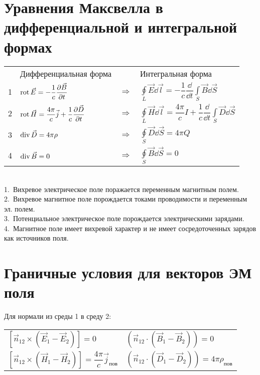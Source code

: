 \begin{multicols*}{2}
		\section{Уравнения Максвелла в дифференциальной и интегральной формах}
        \begin{tabular}{c|lcl|}
            {} & {Дифференциальная форма} & {} & {Интегральная форма} \\
            {1} & {$\operatorname{rot}\vec{E}=-\dfrac1c\dfrac{\partial{\vec{B}}}{\partial{t}}$} & {$\Rightarrow$} & { $\oint\limits_L\vec{E}\dd\vec{l}=-\dfrac1c\dfrac\dd{\dd{t}}\int\limits_S\vec{B}\dd{\vec{S}}$} \\

            {2} & {$\operatorname{rot}\vec{H} = \dfrac{4\pi}{c}\vec{j} + \dfrac1c\dfrac{\partial{\vec{D}}}{\partial{t}}$} & {$\Rightarrow$} & {$\oint\limits_L\vec{H}\dd\vec{l} = \dfrac{4\pi}{c}I+\dfrac1c\dfrac\dd{\dd{t}}\int\limits_S\vec{D}\dd{\vec{S}}$} \\

            {3} & {$\operatorname{div}\vec{D}=4\pi \rho$} & {$\Rightarrow$} & {$\oint\limits_S\vec{D}\dd{\vec{S}}=4\pi Q$} \\

            {4} & {$\operatorname{div}\vec{B}=0$} & {$\Rightarrow$} & {$\oint\limits_S\vec{B}\dd{\vec{S}}=0$}
         \end{tabular} \\
         1.~Вихревое электрическое поле поражается переменным магнитным полем. \\
         2.~Вихревое магнитное поле порождается токами проводимости и переменным эл. полем. \\
         3.~Потенциальное электрическое поле порождается электрическими зарядами. \\
         4.~Магнитное поле имеет вихревой характер и не имеет сосредоточенных зарядов как источников поля.

		\section{Граничные условия для векторов ЭМ поля}
        Для нормали из среды 1 в среду 2: \\
        \begin{tabular}{l|l}
            $\left[\vec{n}_{12}\times(\vec E_1-\vec E_2)\right]=0$ &
            $\left(\vec{n}_{12}\cdot(\vec B_1-\vec B_2)\right)=0$ \\
            $\left[\vec{n}_{12}\times(\vec H_1-\vec H_2)\right]=\dfrac{4\pi}{c}\vec j_{\text{пов}}$ &
            $\left(\vec{n}_{12}\cdot(\vec D_1-\vec D_2)\right)=4\pi \rho_{\text{пов}}$
        \end{tabular}


\end{multicols*}
